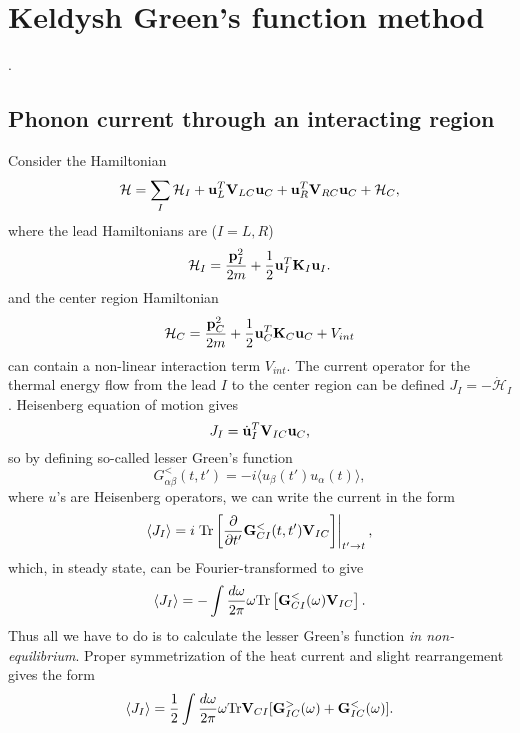 \chapter{Keldysh Green's function method}


\label{app:keldysh}. 
\section{Phonon current through an interacting region}
Consider the Hamiltonian 
\begin{equation}
 \mathcal{H} = \sum_I \mathcal{H}_I + \mathbf{u}_L^T \mathbf{V}_{LC} \mathbf{u}_C +  \mathbf{u}_R^T \mathbf{V}_{RC} \mathbf{u}_C + \mathcal{H}_C,
\end{equation}
where the lead Hamiltonians are ($I=L,R$)
\begin{equation}
 \mathcal{H}_I = \frac{\mathbf{p}_I^2}{2m} + \frac{1}{2} \mathbf{u}_I^T \mathbf{K}_I \mathbf{u}_I.
\end{equation}
and the center region Hamiltonian 
\begin{equation}
 \mathcal{H}_C = \frac{\mathbf{p}_C^2}{2m} + \frac{1}{2} \mathbf{u}_C^T \mathbf{K}_C \mathbf{u}_C + V_{int}
\end{equation}
can contain a non-linear interaction term $V_{int}$. The current operator for the thermal energy flow from the lead $I$ to the center region can be defined $J_I = - \dot{\mathcal{H}}_I$. Heisenberg equation of motion gives
\begin{equation}
 J_I = \dot{\mathbf{u}}_I^T \mathbf{V}_{IC} \mathbf{u}_C ,
\end{equation}
so by defining so-called lesser Green's function 
\begin{equation}
 G_{\alpha \beta}^<(t,t') = -i \langle u_{\beta}(t') u_{\alpha}(t) \rangle,
\end{equation}
where $u$'s are Heisenberg operators, we can write the current in the form
\begin{equation}
 \langle J_I \rangle = i \left.  \textrm{Tr}\left[\frac{\partial}{\partial t'} \mathbf{G}^<_{CI}(t,t') \mathbf{V}_{IC} \right] \right|_{t'\to t},
\end{equation}
which, in steady state, can be Fourier-transformed to give  
\begin{equation}
 \langle J_I \rangle =  - \int \frac{d\omega}{2\pi} \omega \textrm{Tr}\left[\mathbf{G}^<_{CI}(\omega) \mathbf{V}_{IC} \right] .
\end{equation}
Thus all we have to do is to calculate the lesser Green's function \textit{in non-equilibrium}. Proper symmetrization of the heat current and slight rearrangement gives the form
\begin{equation}
 \langle J_I \rangle = \frac{1}{2} \int \frac{d\omega}{2\pi} \omega \textrm{Tr}\mathbf{V}_{CI}[\mathbf{G}^>_{IC}(\omega)+\mathbf{G}^<_{IC}(\omega) ] .
\end{equation}

